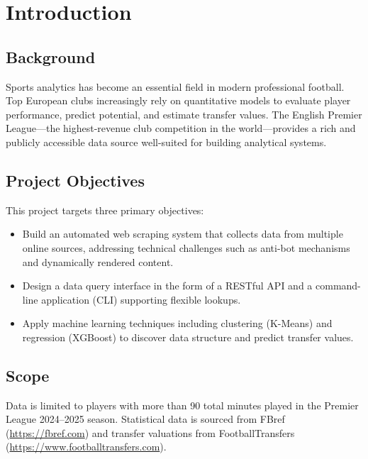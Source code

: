 \documentclass[a4paper,12pt]{report}
\begin{document}
\newpage
\listoffigures
{}

\newpage
\listoftables
{}


\chapter{Introduction}

\section{Background}

Sports analytics has become an essential field in modern professional football. Top European clubs increasingly rely on quantitative models to evaluate player performance, predict potential, and estimate transfer values. The English Premier League---the highest-revenue club competition in the world---provides a rich and publicly accessible data source well-suited for building analytical systems.

\section{Project Objectives}

This project targets three primary objectives:
\begin{itemize}
    \item Build an automated web scraping system that collects data from multiple online sources, addressing technical challenges such as anti-bot mechanisms and dynamically rendered content.
    \item Design a data query interface in the form of a RESTful API and a command-line application (CLI) supporting flexible lookups.
    \item Apply machine learning techniques including clustering (K-Means) and regression (XGBoost) to discover data structure and predict transfer values.
\end{itemize}

\section{Scope}

Data is limited to players with more than 90 total minutes played in the Premier League 2024--2025 season. Statistical data is sourced from FBref (\url{https://fbref.com}) and transfer valuations from FootballTransfers (\url{https://www.footballtransfers.com}).
\end{document}
